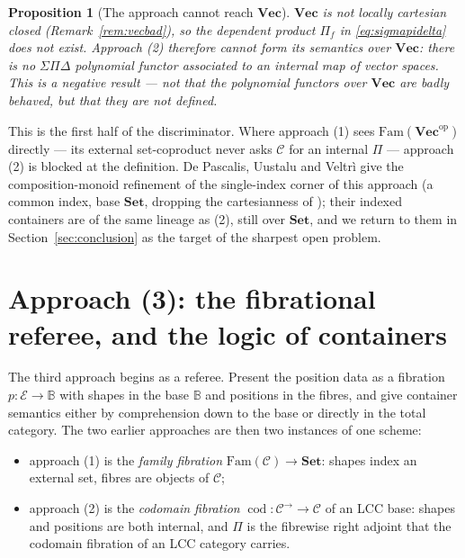 \documentclass[11pt]{amsart}
\theoremstyle{plain}
\newtheorem{proposition}[theorem]{Proposition}
\theoremstyle{definition}
\theoremstyle{remark}
\newcommand{\C}{\mathcal{C}}
\newcommand{\E}{\mathcal{E}}
\newcommand{\Set}{\mathbf{Set}}
\newcommand{\Vect}{\mathbf{Vec}}
\newcommand{\Fam}{\mathrm{Fam}}
\newcommand{\op}{\mathrm{op}}
\DeclareMathOperator{\cod}{cod}
\newcommand{\Arr}[1]{#1^{\rightarrow}}
\begin{document}
\begin{proposition}[The approach cannot reach $\Vect$]\label{prop:novecpoly}
$\Vect$ is not locally cartesian closed (Remark~\ref{rem:vecbad}), so the dependent product $\Pi_f$
in \eqref{eq:sigmapidelta} does not exist. Approach (2) therefore cannot form its semantics over
$\Vect$: there is no $\Sigma\Pi\Delta$ polynomial functor associated to an internal map of vector
spaces. This is a \emph{negative} result --- not that the polynomial functors over $\Vect$ are
badly behaved, but that they are not defined.
\end{proposition}

This is the first half of the discriminator. Where approach (1) sees $\Fam(\Vect^\op)$ directly ---
its external set-coproduct never asks $\C$ for an internal $\Pi$ --- approach (2) is blocked at the
definition. De Pascalis, Uustalu and Veltr\`i \cite{DPUV} give the composition-monoid refinement of
the single-index corner of this approach (a common index, base $\Set$, dropping the cartesianness of
\cite{GambinoKock}); their indexed containers are of the same lineage as (2), still over $\Set$, and
we return to them in Section~\ref{sec:conclusion} as the target of the sharpest open problem.

\section{Approach (3): the fibrational referee, and the logic of containers}\label{sec:fibrational}

The third approach begins as a referee. Present the position data as a fibration
$p\colon\E\to\mathbb{B}$ with shapes in the base $\mathbb{B}$ and positions in the fibres, and give
container semantics either by comprehension down to the base or directly in the total category. The
two earlier approaches are then two instances of one scheme:

\begin{itemize}
\item approach (1) is the \emph{family fibration} $\Fam(\C)\to\Set$: shapes index an external set,
fibres are objects of $\C$;
\item approach (2) is the \emph{codomain fibration} $\cod\colon\Arr{\C}\to\C$ of an LCC base:
shapes and positions are both internal, and $\Pi$ is the fibrewise right adjoint that the codomain
fibration of an LCC category carries.
\end{itemize}
\end{document}
